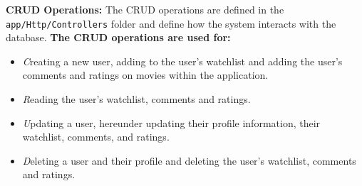 \textbf{CRUD Operations:}
The CRUD operations are defined in the \texttt{app/Http/Controllers} folder and define how the system interacts with the database.
\textbf{The CRUD operations are used for:}
\begin{itemize}
    \item \textit{C}reating a new user, adding to the user's watchlist and adding the user's comments and ratings on movies within the application.
    \item \textit{R}eading the user's watchlist, comments and ratings.
    \item \textit{U}pdating a user, hereunder updating their profile information, their watchlist, comments, and ratings.
    \item \textit{D}eleting a user and their profile and deleting the user's watchlist, comments and ratings.
\end{itemize}


